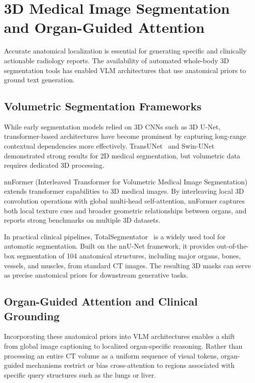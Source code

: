 \section{3D Medical Image Segmentation and Organ-Guided Attention}\label{sec:rw_3dseg}

Accurate anatomical localization is essential for generating specific and clinically actionable radiology reports. The availability of automated whole-body 3D segmentation tools has enabled VLM architectures that use anatomical priors to ground text generation.

\subsection{Volumetric Segmentation Frameworks}

While early segmentation models relied on 3D CNNs such as 3D U-Net, transformer-based architectures have become prominent by capturing long-range contextual dependencies more effectively. TransUNet~\cite{chen2021transunet} and Swin-UNet~\cite{cao2023swin} demonstrated strong results for 2D medical segmentation, but volumetric data requires dedicated 3D processing. 

nnFormer (Interleaved Transformer for Volumetric Medical Image Segmentation)~\cite{zhou2021nnformer} extends transformer capabilities to 3D medical images. By interleaving local 3D convolution operations with global multi-head self-attention, nnFormer captures both local texture cues and broader geometric relationships between organs, and reports strong benchmarks on multiple 3D datasets.

In practical clinical pipelines, TotalSegmentator~\cite{wasserthal2023totalsegmentator} is a widely used tool for automatic segmentation. Built on the nnU-Net framework, it provides out-of-the-box segmentation of 104 anatomical structures, including major organs, bones, vessels, and muscles, from standard CT images. The resulting 3D masks can serve as precise anatomical priors for downstream generative tasks.

\subsection{Organ-Guided Attention and Clinical Grounding}

Incorporating these anatomical priors into VLM architectures enables a shift from global image captioning to localized organ-specific reasoning. Rather than processing an entire CT volume as a uniform sequence of visual tokens, organ-guided mechanisms restrict or bias cross-attention to regions associated with specific query structures such as the lungs or liver.

